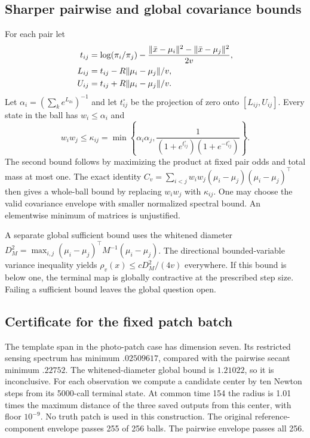 \subsection{Sharper pairwise and global covariance bounds}
For each pair let
\begin{align}
 t_{ij}&=\log(\pi_i/\pi_j)
 -\frac{\lVert\bar x-\mu_i\rVert^2-\lVert\bar x-\mu_j\rVert^2}{2v},\\
 L_{ij}&=t_{ij}-R\lVert\mu_i-\mu_j\rVert/v,\nonumber\\
 U_{ij}&=t_{ij}+R\lVert\mu_i-\mu_j\rVert/v .
\end{align}
Let $\alpha_i=(\sum_k e^{L_{ki}})^{-1}$ and let $t^\circ_{ij}$
be the projection of zero onto $[L_{ij},U_{ij}]$.
Every state in the ball has $w_i\le\alpha_i$ and
\[
 w_iw_j\le\kappa_{ij}
 =\min\left\{\alpha_i\alpha_j,
 \frac1{(1+e^{t^\circ_{ij}})(1+e^{-t^\circ_{ij}})}\right\}.
\]
The second bound follows by maximizing the product at fixed pair
odds and total mass at most one.
The exact identity
$C_v=\sum_{i<j}w_iw_j(\mu_i-\mu_j)(\mu_i-\mu_j)^\top$
then gives a whole-ball bound by replacing $w_iw_j$ with $\kappa_{ij}$.
One may choose the valid covariance envelope with smaller normalized
spectral bound. An elementwise minimum of matrices is unjustified.

A separate global sufficient bound uses the whitened diameter
$D_M^2=\max_{i,j}(\mu_i-\mu_j)^\top M^{-1}(\mu_i-\mu_j)$.
The directional bounded-variable variance inequality yields
$\rho_v(x)\le cD_M^2/(4v)$ everywhere.
If this bound is below one, the terminal map is globally contractive
at the prescribed step size.
Failing a sufficient bound leaves the global question open.

\subsection{Certificate for the fixed patch batch}
The template span in the photo-patch case has dimension seven.
Its restricted sensing spectrum has minimum $.02509617$,
compared with the pairwise secant minimum $.22752$.
The whitened-diameter global bound is $1.21022$, so it is inconclusive.
For each observation we compute a candidate center by ten Newton
steps from its 5000-call terminal state.
At common time 154 the radius is 1.01 times the maximum distance
of the three saved outputs from this center, with floor $10^{-9}$.
No truth patch is used in this construction.
The original reference-component envelope passes 255 of 256 balls.
The pairwise envelope passes all 256.

